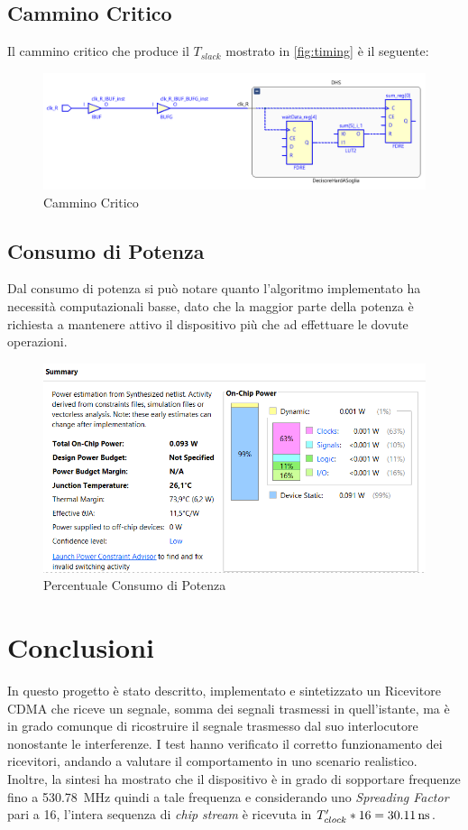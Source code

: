 \documentclass[a4paper,12pt]{article}
\begin{document}
  \subsection{Cammino Critico}
    Il cammino critico che produce il $T_{slack}$ mostrato in \ref{fig:timing} è il seguente:
    \begin{figure}[H]
      \centering
      \includegraphics[width=\textwidth]{img/CamminoCritico.png}
      \caption{Cammino Critico}
      \label{fig:critico}
    \end{figure}
  \subsection{Consumo di Potenza}
    Dal consumo di potenza si può notare quanto l'algoritmo implementato ha necessità computazionali basse, dato che la 
    maggior parte della potenza è richiesta a mantenere attivo il dispositivo più che ad effettuare le dovute operazioni.
    \begin{figure}[H]
      \centering
      \includegraphics[width=\textwidth]{img/Power.png}
      \caption{Percentuale Consumo di Potenza}
      \label{fig:power}
    \end{figure}
\section{Conclusioni}
  In questo progetto è stato descritto, implementato e sintetizzato un Ricevitore CDMA che riceve un segnale, somma
  dei segnali trasmessi in quell'istante, ma è in grado comunque di ricostruire il segnale trasmesso dal suo interlocutore
  nonostante le interferenze. I test hanno verificato il corretto funzionamento dei ricevitori, andando a valutare il 
  comportamento in uno scenario realistico. Inoltre, la sintesi ha mostrato che il dispositivo è in grado di sopportare 
  frequenze fino a \SI{530.78}{\mega\hertz} quindi a tale frequenza e considerando uno \textit{Spreading Factor} pari a 16,
  l'intera sequenza di \textit{chip stream} è ricevuta in $T'_{clock}*16 = \text{\SI{30.11}{\nano\second}}$. 
\end{document}

